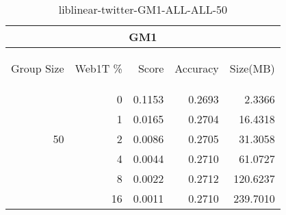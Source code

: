 \begin{center}
\begin{table}[htbp]
\begin{tabular}{ | r | r | r | r | r |}
\hline
\multicolumn{5}{|c|}{GM1}\\
\hline
\begin{sideways}Group Size\end{sideways} & \begin{sideways}Web1T \%\end{sideways} & \begin{sideways}Score\end{sideways} & \begin{sideways}Accuracy\end{sideways} & \begin{sideways}Size(MB)\end{sideways}\\
\hline
\multirow{5}{*}{50}
 & 0 & 0.1153 & 0.2693 & 2.3366\\ \cline{2-5}
 & 1 & 0.0165 & 0.2704 & 16.4318\\ \cline{2-5}
 & 2 & 0.0086 & 0.2705 & 31.3058\\ \cline{2-5}
 & 4 & 0.0044 & 0.2710 & 61.0727\\ \cline{2-5}
 & 8 & 0.0022 & 0.2712 & 120.6237\\ \cline{2-5}
 & 16 & 0.0011 & 0.2710 & 239.7010\\ \cline{2-5}
\hline
\end{tabular}
\caption{liblinear-twitter-GM1-ALL-ALL-50}
\label{table:liblinear-twitter-GM1-ALL-ALL-50}
\end{table}
\end{center}


